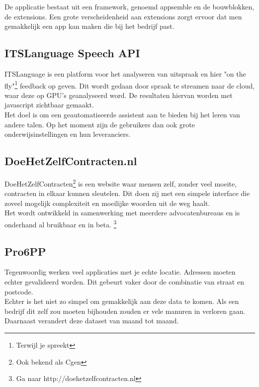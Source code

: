 De applicatie bestaat uit een framework, genoemd appsemble en de bouwblokken, de extensions. Een grote verscheidenheid aan extensions zorgt ervoor dat men gemakkelijk een app kan maken die bij het bedrijf past.

\subsection{ITSLanguage Speech API}

ITSLanguage is een platform voor het analyseren van uitspraak en hier "on the fly"\footnote{Terwijl je spreekt} feedback op geven. Dit wordt gedaan door spraak te streamen naar de cloud, waar deze op GPU's geanalyseerd word. De resultaten hiervan worden met javascript zichtbaar gemaakt. \\

Het doel is om een geautomatiseerde assistent aan te bieden  bij het leren van andere talen. Op het moment zijn de gebruikers dan  ook grote onderwijsinstellingen en hun leveranciers.

\subsection{DoeHetZelfContracten.nl}

DoeHetZelfContracten\footnote{Ook bekend als Cgen} is een website waar mensen zelf, zonder veel moeite, contracten in elkaar kunnen sleutelen. Dit doen zij met een simpele interface die zoveel mogelijk complexiteit en moeilijke woorden uit de weg haalt. \\

Het wordt ontwikkeld in samenwerking met meerdere advocatenbureaus en is onderhand al bruikbaar en in beta. \footnote{Ga naar http://doehetzelfcontracten.nl}

\subsection{Pro6PP}

Tegenwoordig werken veel applicaties met je echte locatie. Adressen moeten echter gevalideerd worden. Dit gebeurt vaker door de combinatie van straat en postcode. \\

Echter is het niet zo simpel om gemakkelijk aan deze data te komen. Als een bedrijf dit zelf zou moeten bijhouden zouden er vele manuren in verloren gaan. Daarnaast verandert deze dataset van maand tot maand. \\

